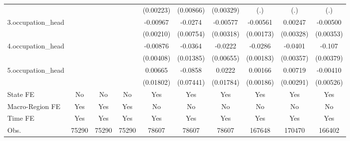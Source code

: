 \begin{table}[htbp]
\begin{tabular}{l*{9}{c}}
            &                     &                     &                     &   (0.00223)         &   (0.00866)         &   (0.00329)         &         (.)         &         (.)         &         (.)         \\
3.occupation\_head&                     &                     &                     &    -0.00967\sym{***}&     -0.0274\sym{***}&    -0.00577\sym{*}  &    -0.00561\sym{***}&     0.00247         &    -0.00500         \\
            &                     &                     &                     &   (0.00210)         &   (0.00754)         &   (0.00318)         &   (0.00173)         &   (0.00328)         &   (0.00353)         \\
4.occupation\_head&                     &                     &                     &    -0.00876\sym{**} &     -0.0364\sym{***}&     -0.0222\sym{***}&     -0.0286\sym{***}&     -0.0401\sym{***}&      -0.107\sym{***}\\
            &                     &                     &                     &   (0.00408)         &   (0.01385)         &   (0.00655)         &   (0.00183)         &   (0.00357)         &   (0.00379)         \\
5.occupation\_head&                     &                     &                     &     0.00665         &     -0.0858         &      0.0222         &     0.00166         &     0.00719\sym{**} &    -0.00410         \\
            &                     &                     &                     &   (0.01802)         &   (0.07441)         &   (0.01784)         &   (0.00186)         &   (0.00291)         &   (0.00526)         \\
State FE    &          No         &          No         &          No         &         Yes         &         Yes         &         Yes         &         Yes         &         Yes         &         Yes         \\
Macro-Region FE &         Yes         &         Yes         &         Yes         &          No         &          No         &          No         &          No         &          No         &          No         \\
Time FE     &         Yes         &         Yes         &         Yes         &         Yes         &         Yes         &         Yes         &         Yes         &         Yes         &         Yes         \\
\hline
Obs.        &       75290         &       75290         &       75290         &       78607         &       78607         &       78607         &      167648         &      170470         &      166402         \\

\end{tabular}
\end{table}
